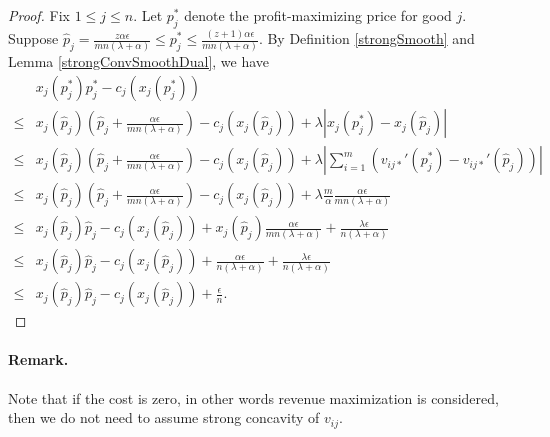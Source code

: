 \documentclass{article}
\begin{document}
\begin{proof}
    Fix $1\le j\le n$. Let $p_j^*$ denote the profit-maximizing price for good $j$. Suppose $\hat{p}_j=\frac{z\alpha\epsilon}{mn(\lambda+\alpha)}\le p_j^*\le \frac{(z+1)\alpha\epsilon}{mn(\lambda+\alpha)}$. By Definition \ref{strongSmooth} and Lemma \ref{strongConvSmoothDual}, we have
    \begin{equation}
        \begin{array}{rl}
             & x_j(p_j^*)p_j^*-c_j(x_j(p_j^*)) \\
             \le & x_j(\hat{p}_j)(\hat{p}_j+\frac{\alpha\epsilon}{mn(\lambda+\alpha)})-c_j(x_j(\hat{p}_j))+\lambda |x_j(p_j^*)-x_j(\hat{p}_j)| \\
             \le & x_j(\hat{p}_j)(\hat{p}_j+\frac{\alpha\epsilon}{mn(\lambda+\alpha)})-c_j(x_j(\hat{p}_j))+\lambda |\sum_{i=1}^{m}(v_{ij*}'(p_j^*)-v_{ij*}'(\hat{p}_j))| \\
            \le & x_j(\hat{p}_j)(\hat{p}_j+\frac{\alpha\epsilon}{mn(\lambda+\alpha)})-c_j(x_j(\hat{p}_j))+\lambda \frac{m}{\alpha}\frac{\alpha\epsilon}{mn(\lambda+\alpha)} \\
            \le & x_j(\hat{p}_j)\hat{p}_j-c_j(x_j(\hat{p}_j))+x_j(\hat{p}_j)\frac{\alpha\epsilon}{mn(\lambda+\alpha)}+ \frac{\lambda\epsilon}{n(\lambda+\alpha)} \\
            \le & x_j(\hat{p}_j)\hat{p}_j-c_j(x_j(\hat{p}_j))+\frac{\alpha\epsilon}{n(\lambda+\alpha)}+ \frac{\lambda\epsilon}{n(\lambda+\alpha)} \\
            \le & x_j(\hat{p}_j)\hat{p}_j-c_j(x_j(\hat{p}_j))+\frac{\epsilon}{n}.
        \end{array}
    \end{equation}
\end{proof}
\paragraph{Remark.}
Note that if the cost is zero, in other words revenue maximization is considered, then we do not need to assume strong concavity of $v_{ij}$.
\end{document}
